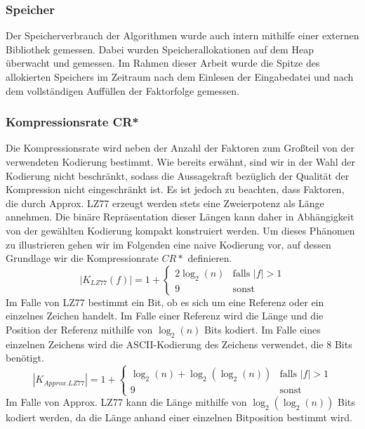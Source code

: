 \subsubsection{Speicher}
Der Speicherverbrauch der Algorithmen wurde auch intern mithilfe einer externen Bibliothek gemessen. Dabei wurden Speicherallokationen auf dem Heap überwacht und 
gemessen. Im Rahmen dieser Arbeit wurde die Spitze des allokierten Speichers im Zeitraum nach dem Einlesen der Eingabedatei und nach dem vollständigen Auffüllen der
Faktorfolge gemessen.

\subsubsection{Kompressionsrate CR*}
Die Kompressionsrate wird neben der Anzahl der Faktoren zum Großteil von der verwendeten Kodierung bestimmt. Wie bereits erwähnt, sind wir in der Wahl der Kodierung
nicht beschränkt, sodass die Aussagekraft bezüglich der Qualität der Kompression nicht eingeschränkt ist. Es ist jedoch zu beachten, dass Faktoren, die durch Approx. LZ77
erzeugt werden stets eine Zweierpotenz als Länge annehmen. Die binäre Repräsentation dieser Längen kann daher in Abhängigkeit von der gewählten Kodierung kompakt 
konstruiert werden. Um dieses Phänomen zu illustrieren gehen wir im Folgenden eine naive Kodierung vor, auf dessen Grundlage wir die Kompressionrate $CR*$ definieren.
\begin{equation}
    |K_{LZ77}(f)| = 1 + \begin{cases}
        2\log_2(n) & \text{falls } |f| > 1 \\
        9 & \text{sonst}
    \end{cases}
\end{equation}
Im Falle von LZ77 bestimmt ein Bit, ob es sich um eine Referenz oder ein einzelnes Zeichen handelt. Im Falle einer Referenz wird die Länge und die Position der Referenz
mithilfe von $\log_2(n)$ Bits kodiert. Im Falle eines einzelnen Zeichens wird die ASCII-Kodierung des Zeichens verwendet, die 8 Bits benötigt.
\begin{equation}
    |K_{Approx.LZ77}|= 1 + \begin{cases}
        \log_2(n)+\log_2(\log_2(n)) & \text{falls } |f| > 1 \\
        9 & \text{sonst}
    \end{cases}
\end{equation}
Im Falle von Approx. LZ77 kann die Länge mithilfe von $\log_2(\log_2(n))$ Bits kodiert werden, da die Länge anhand einer einzelnen Bitposition bestimmt wird.
